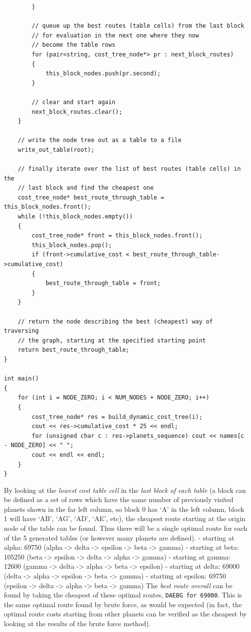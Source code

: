 \documentclass[
]{article}
\begin{document}
\begin{verbatim}
        }

        // queue up the best routes (table cells) from the last block
        // for evaluation in the next one where they now
        // become the table rows
        for (pair<string, cost_tree_node*> pr : next_block_routes)
        {
            this_block_nodes.push(pr.second);
        }

        // clear and start again
        next_block_routes.clear();
    }

    // write the node tree out as a table to a file
    write_out_table(root);

    // finally iterate over the list of best routes (table cells) in the 
    // last block and find the cheapest one
    cost_tree_node* best_route_through_table = this_block_nodes.front();
    while (!this_block_nodes.empty())
    {
        cost_tree_node* front = this_block_nodes.front();
        this_block_nodes.pop();
        if (front->cumulative_cost < best_route_through_table->cumulative_cost)
        {
            best_route_through_table = front;
        }
    }

    // return the node describing the best (cheapest) way of traversing 
    // the graph, starting at the specified starting point
    return best_route_through_table;
}

int main()
{
    for (int i = NODE_ZERO; i < NUM_NODES + NODE_ZERO; i++)
    {
        cost_tree_node* res = build_dynamic_cost_tree(i);
        cout << res->cumulative_cost * 25 << endl;
        for (unsigned char c : res->planets_sequence) cout << names[c - NODE_ZERO] << " ";
        cout << endl << endl;
    }
}
\end{verbatim}

By looking at the \emph{lowest cost table cell} in the \emph{last block
of each table} (a block can be defined as a set of rows which have the
same number of previously visited planets shown in the far left column,
so block 0 has `A' in the left column, block 1 will have `AB', `AG',
`AD', `AE', etc), the cheapest route starting at the origin node of the
table can be found. Thus there will be a single optimal route for each
of the 5 generated tables (or however many planets are defined). -
starting at alpha: 69750 (alpha -\textgreater{} delta -\textgreater{}
epsilon -\textgreater{} beta -\textgreater{} gamma) - starting at beta:
105250 (beta -\textgreater{} epsilon -\textgreater{} delta
-\textgreater{} alpha -\textgreater{} gamma) - starting at gamma: 12600
(gamma -\textgreater{} delta -\textgreater{} alpha -\textgreater{} beta
-\textgreater{} epsilon) - starting at delta: 69000 (delta
-\textgreater{} alpha -\textgreater{} epsilon -\textgreater{} beta
-\textgreater{} gamma) - starting at epsilon: 69750 (epsilon
-\textgreater{} delta -\textgreater{} alpha -\textgreater{} beta
-\textgreater{} gamma) The \emph{best route overall} can be found by
taking the cheapest of these optimal routes, \texttt{DAEBG\ for\ 69000}.
This is the same optimal route found by brute force, as would be
expected (in fact, the optimal route costs starting from other planets
can be verified as the cheapest by looking at the results of the brute
force method).
\end{document}

